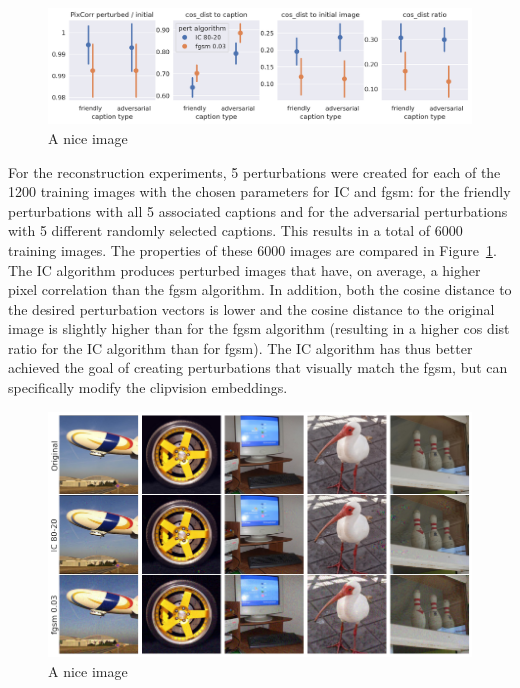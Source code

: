 
\begin{figure}[ht]
    \centering
    \includegraphics[width=1\textwidth]{plots/advpert_validation_chosen_perts.png}
    \caption{A nice image}\label{fig:advpert_validation_chosen_perts} %
\end{figure}
    
For the reconstruction experiments, 5 perturbations were created for each of the 1200 training images with the chosen parameters for IC and fgsm: for the friendly perturbations with all 5 associated captions and for the adversarial perturbations with 5 different randomly selected captions. This results in a total of 6000 training images. The properties of these 6000 images are compared in Figure~\ref{fig:advpert_validation_chosen_perts}. The IC algorithm produces perturbed images that have, on average, a higher pixel correlation than the fgsm algorithm. In addition, both the cosine distance to the desired perturbation vectors is lower and the cosine distance to the original image is slightly higher than for the fgsm algorithm (resulting in a higher cos dist ratio for the IC algorithm than for fgsm). The IC algorithm has thus better achieved the goal of creating perturbations that visually match the fgsm, but can specifically modify the clipvision embeddings.

\begin{figure}[ht]
    \centering
    \includegraphics[width=1\textwidth]{plots/advpert_validation_chosen_qual.png}
    \caption{A nice image}\label{fig:advpert_validation_chosen_qual}
\end{figure}

